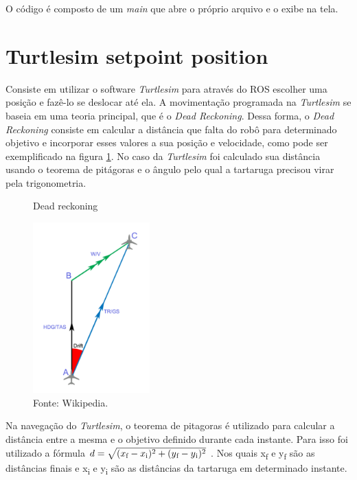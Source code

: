 O código é composto de um \textit{main} que abre o próprio arquivo e o exibe na tela.



\section{Turtlesim setpoint position}

Consiste em utilizar o software \textit{Turtlesim} para através do ROS escolher uma posição e fazê-lo se deslocar até ela. A movimentação programada na \textit{Turtlesim} se baseia em uma teoria principal, que é o \textit{Dead Reckoning}. Dessa forma, o \textit{Dead Reckoning} consiste em calcular a distância que falta do robô para determinado objetivo e incorporar esses valores a sua posição e velocidade, como pode ser exemplificado na figura \ref{fig:Dead reckoning}. No caso da \textit{Turtlesim} foi calculado sua distância usando o teorema de pitágoras e o ângulo pelo qual a tartaruga precisou virar pela trigonometria.


\begin{figure}[h!]
    \centering
    \caption{Dead reckoning}
    \includegraphics[width=0.4\textwidth]{Figures/dead_reck.png}
    \caption*{Fonte: Wikipedia.}
    \label{fig:Dead reckoning}
\end{figure}

Na navegação do \textit{Turtlesim}, o teorema de pitagoras é utilizado para calcular
a distância entre a mesma e o objetivo definido durante cada instante. Para isso foi utilizado a fórmula 
    $d = \sqrt{(x\textsubscript{f} - x\textsubscript{i})^2 + (y\textsubscript{f} - y\textsubscript{i})^2}$
. Nos quais x\textsubscript{f} e y\textsubscript{f} são as distâncias finais e x\textsubscript{i} e y\textsubscript{i} são as distâncias da tartaruga em determinado instante.

